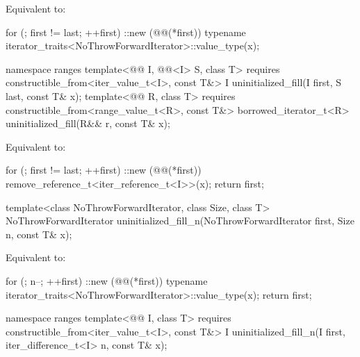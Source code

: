 \begin{itemdescr}
\pnum
\effects
Equivalent to:
\begin{codeblock}
for (; first != last; ++first)
  ::new (@@(*first))
    typename iterator_traits<NoThrowForwardIterator>::value_type(x);
\end{codeblock}
\end{itemdescr}

%
\begin{itemdecl}
namespace ranges {
  template<@@ I, @@<I> S, class T>
      requires constructible_from<iter_value_t<I>, const T&>
    I uninitialized_fill(I first, S last, const T& x);
  template<@@ R, class T>
      requires constructible_from<range_value_t<R>, const T&>
    borrowed_iterator_t<R> uninitialized_fill(R&& r, const T& x);
}
\end{itemdecl}

\begin{itemdescr}
\effects
Equivalent to:
\begin{codeblock}
for (; first != last; ++first) {
  ::new (@@(*first)) remove_reference_t<iter_reference_t<I>>(x);
}
return first;
\end{codeblock}
\end{itemdescr}

%
\begin{itemdecl}
template<class NoThrowForwardIterator, class Size, class T>
  NoThrowForwardIterator uninitialized_fill_n(NoThrowForwardIterator first, Size n, const T& x);
\end{itemdecl}

\begin{itemdescr}
\pnum
\effects
Equivalent to:
\begin{codeblock}
for (; n--; ++first)
  ::new (@@(*first))
    typename iterator_traits<NoThrowForwardIterator>::value_type(x);
return first;
\end{codeblock}
\end{itemdescr}

%
\begin{itemdecl}
namespace ranges {
  template<@@ I, class T>
      requires constructible_from<iter_value_t<I>, const T&>
    I uninitialized_fill_n(I first, iter_difference_t<I> n, const T& x);
}
\end{itemdecl}

